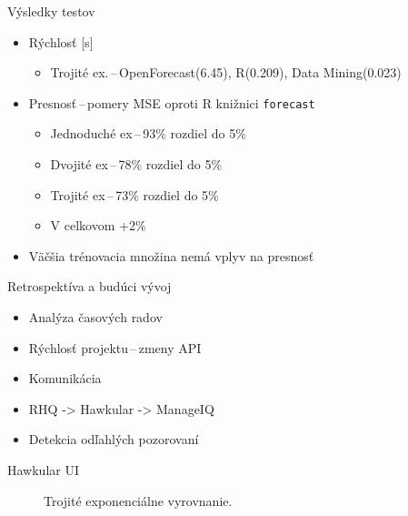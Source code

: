 \documentclass{beamer}
\begin{document}
\begin{frame}{Výsledky testov}
  \begin{itemize}
      \item Rýchlosť [s]
          \begin{itemize}
              \item Trojité ex.\,--\,OpenForecast(6.45), R(0.209), Data Mining(0.023)
          \end{itemize}
      \item Presnosť\,--\,pomery MSE oproti R knižnici \texttt{forecast}
          \begin{itemize}
              \item Jednoduché ex\,--\,93\% rozdiel do 5\%
              \item Dvojité ex\,--\,78\% rozdiel do 5\%
              \item Trojité ex\,--\,73\% rozdiel do 5\%
              \item V celkovom +2\%
          \end{itemize}
      \item Väčšia trénovacia množina nemá vplyv na presnosť
  \end{itemize}
\end{frame}

\begin{frame}{Retrospektíva a budúci vývoj}
  \begin{itemize}
      \item Analýza časových radov
      \item Rýchlosť projektu\,--\,zmeny API
      \item Komunikácia
      \item RHQ -> Hawkular -> ManageIQ
      \item Detekcia odľahlých pozorovaní
  \end{itemize}
\end{frame}

\begin{frame}{Hawkular UI}
  \begin{figure}[h]
    \begin{center}
        \caption{Trojité exponenciálne vyrovnanie.}
    \end{center}
  \end{figure}
\end{frame}
\end{document}
